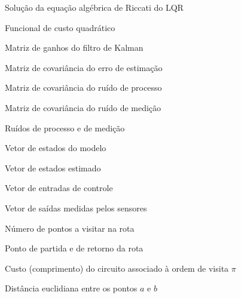 \begin{simbolos}
    \item[$\mathbf{S}$] Solução da equação algébrica de Riccati do LQR
    \item[$J$] Funcional de custo quadrático
    \item[$\mathbf{L}$] Matriz de ganhos do filtro de Kalman
    \item[$\mathbf{P}$] Matriz de covariância do erro de estimação
    \item[$\mathbf{Q}_w$] Matriz de covariância do ruído de processo
    \item[$\mathbf{R}_v$] Matriz de covariância do ruído de medição
    \item[$\mathbf{w},\mathbf{v}$] Ruídos de processo e de medição
    \item[$\mathbf{x}$] Vetor de estados do modelo
    \item[$\hat{\mathbf{x}}$] Vetor de estados estimado
    \item[$\mathbf{u}$] Vetor de entradas de controle
    \item[$\mathbf{y}$] Vetor de saídas medidas pelos sensores
    \item[$N$] Número de pontos a visitar na rota
    \item[$P_0$] Ponto de partida e de retorno da rota
    \item[$C(\pi)$] Custo (comprimento) do circuito associado à ordem de visita $\pi$
    \item[$d(a,b)$] Distância euclidiana entre os pontos $a$ e $b$
\end{simbolos}
